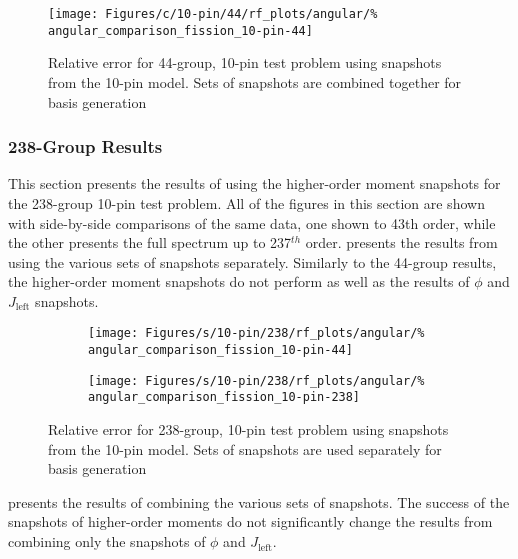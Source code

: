 \begin{figure*}[tb]
    \centering
    \texttt{[image: Figures/c/10-pin/44/rf\_plots/angular/\%
        angular\_comparison\_fission\_10-pin-44]}
    \caption{Relative error for 44-group, 10-pin test problem using 
        snapshots from the 10-pin model.  Sets of snapshots are combined 
        together for basis generation}
    \label{fig:10-pin_10-pin-combined}
\end{figure*}

\subsubsection{238-Group Results}

This section presents the results of using the higher-order moment snapshots 
for the 238-group 10-pin test problem.  All of the figures in 
this section are shown with side-by-side comparisons of the same data, one 
shown to 43th order, while the other presents the full spectrum up to 
237$^{th}$ order.   presents the results 
from using the various sets of snapshots separately.  Similarly to the 44-group 
results, the higher-order moment snapshots do not perform as well as the 
results of $\phi$ and $J_{\text{left}}$ snapshots.

\begin{figure*}[tb]
    \centering
    \begin{subfigure}{0.5\textwidth}
        \centering
        \texttt{[image: Figures/s/10-pin/238/rf\_plots/angular/\%
            angular\_comparison\_fission\_10-pin-44]}
    \end{subfigure}%
    \begin{subfigure}{0.5\textwidth}
        \centering
        \texttt{[image: Figures/s/10-pin/238/rf\_plots/angular/\%
            angular\_comparison\_fission\_10-pin-238]}
    \end{subfigure}
    \caption{Relative error for 238-group, 10-pin test problem using 
        snapshots from the 10-pin model.  Sets of snapshots are used 
        separately for basis generation}
    \label{fig:10-pin_10-pin-single-238}
\end{figure*}

 presents the results of combining the 
various sets of snapshots.  The success of the snapshots of higher-order 
moments do not significantly change the results from combining only the 
snapshots of $\phi$ and $J_{\text{left}}$.

